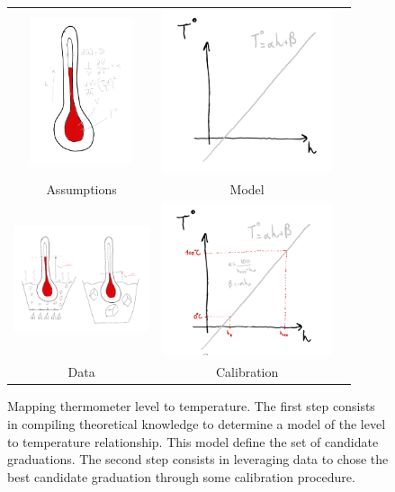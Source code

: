 \begin{bibunit}
\begin{figure}[h]
\begin{tabular}{ccc}
    \includegraphics[clip, width=3cm, width=3cm]{Introduction/pics/therm_theroy.png} &   \includegraphics[clip, width=5cm]{Introduction/pics/therm_model.png}  &   \\   Assumptions & Model&\\ 
     \includegraphics[clip, width=4cm, height=4cm, trim={2cm 1cm 2cm 2cm}]{Introduction/pics/therm_obs.png} &    \includegraphics[clip, width=5cm]{Introduction/pics/therm_calib.png}   &  \\    Data & Calibration&\\
\end{tabular}

    \caption{Mapping thermometer level to temperature. The first step consists in compiling theoretical knowledge to determine a model of the level to temperature relationship. This model define the set of candidate graduations. The second step consists in leveraging data to chose the best candidate graduation through some calibration procedure.}
    \label{fig:therm_mapping}
\end{figure}


\end{bibunit}
